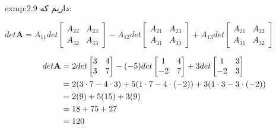 {\begin{spacing}{1.3}
\begin{exmp}{exmp:2.9}
            داریم که:

            $det\textbf{A}=A_{11}det\begin{bmatrix}
                                        A_{22} & A_{23} \\
                                        A_{32} & A_{33}
            \end{bmatrix}-A_{12}det\begin{bmatrix}
                                       A_{21} & A_{23} \\
                                       A_{31} & A_{33}
            \end{bmatrix}+A_{13}det\begin{bmatrix}
                                       A_{21} & A_{22} \\
                                       A_{31} & A_{32}
            \end{bmatrix}$

            \begin{equation*}
                \centering
                \begin{split}
                    det\textbf{A}&=2det\begin{bmatrix}
                                           3 & 4 \\
                                           3 & 7
                    \end{bmatrix}-(-5)det\begin{bmatrix}
                                             1  & 4 \\
                                             -2 & 7
                    \end{bmatrix}+3det\begin{bmatrix}
                                          1  & 3 \\
                                          -2 & 3
                    \end{bmatrix}\\
                    &=2(3\cdot 7-4\cdot 3)+5(1\cdot 7-4\cdot(-2))+3(1\cdot 3-3\cdot(-2)) \\
                    &=2(9)+5(15)+3(9) \\
                    &=18+75+27 \\
                    &=120
                \end{split}
            \end{equation*}
        \end{exmp}
    \end{spacing}
}


